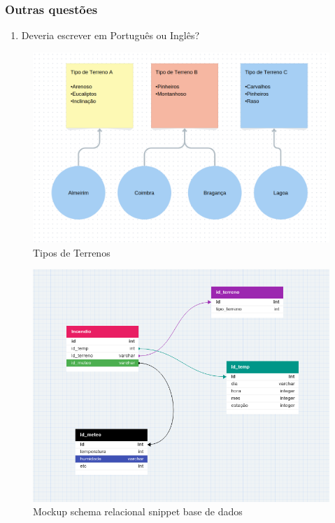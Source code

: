 \documentclass{article}
\begin{document}
\subsubsection{Outras questões}
\begin{enumerate}
    \item Deveria escrever em Português ou Inglês?
\end{enumerate}


\begin{figure}[H]
 \centering
  \includegraphics[width=1.0\linewidth]{imgs/tipo_de_terreno.png}
   \caption{\label{fig:tipos_de_terreno}Tipos de Terrenos}
\end{figure}

\begin{figure}[H]
 \centering
  \includegraphics[width=1.0\linewidth]{imgs/db_schema.png}
   \caption{\label{fig:db_schema}Mockup schema relacional snippet base de dados}
\end{figure}
\end{document}
